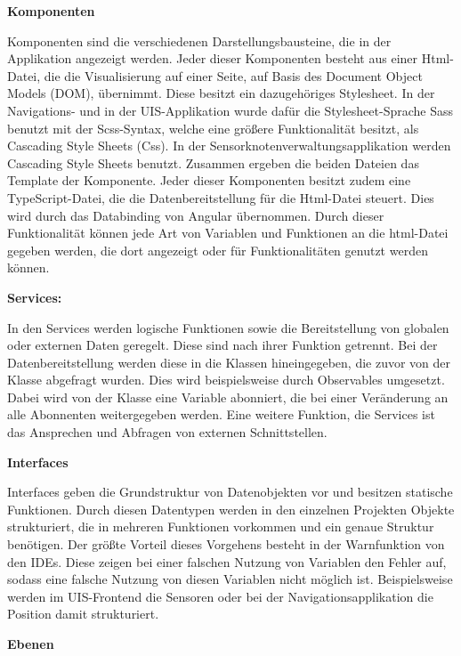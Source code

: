 \textbf{Komponenten}

Komponenten sind die verschiedenen Darstellungsbausteine, die in der Applikation angezeigt werden. 
Jeder dieser Komponenten besteht aus einer Html-Datei, die die Visualisierung auf einer Seite, auf Basis des Document Object Models (DOM), übernimmt. 
Diese besitzt ein dazugehöriges Stylesheet. 
In der Navigations- und in der UIS-Applikation wurde dafür die Stylesheet-Sprache Sass benutzt mit der Scss-Syntax, welche eine größere Funktionalität besitzt, als Cascading Style Sheets (Css). 
In der Sensorknotenverwaltungsapplikation werden Cascading Style Sheets benutzt. 
Zusammen ergeben die beiden Dateien das Template der Komponente. 
Jeder dieser Komponenten besitzt zudem eine TypeScript-Datei, die die Datenbereitstellung für die Html-Datei steuert. 
Dies wird durch das Databinding von Angular übernommen. 
Durch dieser Funktionalität können jede Art von Variablen und Funktionen an die html-Datei gegeben werden, die dort angezeigt oder für Funktionalitäten genutzt werden können.


\textbf{Services:}

In den Services werden logische Funktionen sowie die Bereitstellung von globalen oder externen Daten geregelt. 
Diese sind nach ihrer Funktion getrennt. 
Bei der Datenbereitstellung werden diese in die Klassen hineingegeben, die zuvor von der Klasse abgefragt wurden. 
Dies wird beispielsweise durch Observables umgesetzt. 
Dabei wird von der Klasse eine Variable abonniert, die bei einer Veränderung an alle Abonnenten weitergegeben werden. 
Eine weitere Funktion, die Services ist das Ansprechen und Abfragen von externen Schnittstellen.  


\textbf{Interfaces}

Interfaces geben die Grundstruktur von Datenobjekten vor und besitzen statische Funktionen. 
Durch diesen Datentypen werden in den einzelnen Projekten Objekte strukturiert, die in mehreren Funktionen vorkommen und ein genaue Struktur benötigen. 
Der größte Vorteil dieses Vorgehens besteht in der Warnfunktion von den IDEs. 
Diese zeigen bei einer falschen Nutzung von Variablen den Fehler auf, sodass eine falsche Nutzung von diesen Variablen nicht möglich ist. 
Beispielsweise werden im UIS-Frontend die Sensoren oder bei der Navigationsapplikation die Position damit strukturiert.


\textbf{Ebenen}

